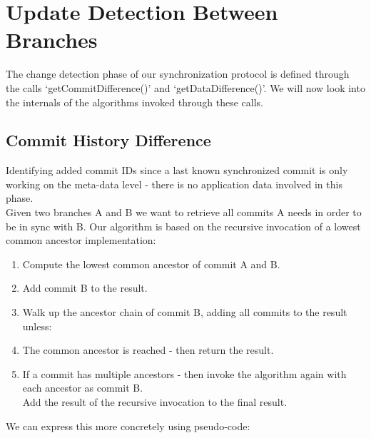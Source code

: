 
\section{Update Detection Between Branches}
\label{sec:histo.diff-across-commits}

The change detection phase of our synchronization protocol is defined through the calls `getCommitDifference()' and `getDataDifference()'.
We will now look into the internals of the algorithms invoked through these calls.\\

\subsection{Commit History Difference}
Identifying added commit IDs since a last known synchronized commit is only working on the meta-data level - there is no application data involved in this phase.\\
Given two branches A and B we want to retrieve all commits A needs in order to be in sync with B.
Our algorithm is based on the recursive invocation of a lowest common ancestor implementation:\\

\begin{enumerate}
\item Compute the lowest common ancestor of commit A and B.
\item Add commit B to the result.
\item Walk up the ancestor chain of commit B, adding all commits to the result unless:
\item The common ancestor is reached - then return the result.
\item If a commit has multiple ancestors - then invoke the algorithm again with each ancestor as commit B.\\
Add the result of the recursive invocation to the final result.
\end{enumerate}

We can express this more concretely using pseudo-code:\\


